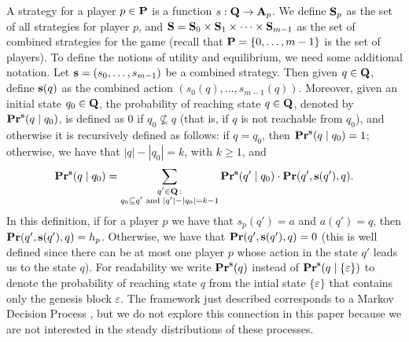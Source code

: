 A strategy for a player $p \in \mathbf{P}$ is a function $s : \mathbf{Q} \rightarrow \mathbf{A}_p$.
We define $\mathbf{S}_p$ as the set of all strategies for player $p$, and $\mathbf{S} = \mathbf{S}_0 \times \mathbf{S}_{1} \times \cdots \times \mathbf{S}_{m-1}$ as the set of combined strategies for the game (recall 
that $\mathbf{P} = \{0, \ldots, m-1\}$ is the set of players).
To define the notions of utility and equilibrium, we need some additional notation.
Let $\mathbf{s} = (s_0, \ldots, s_{m-1})$ be a combined strategy.
Then given $q \in \mathbf{Q}$, define $\mathbf{s}(q)$ as the combined action $(s_0(q), \ldots, s_{m-1}(q))$. Moreover, given an initial state $q_0 \in \mathbf{Q}$,
the probability of reaching state $q \in \mathbf{Q}$, denoted by $\mathbf{Pr}^{\mathbf{s}}(q \mid q_0)$, is defined as 0 if $q_0 \not\subseteq q$ (that is, if $q$ is not reachable from $q_0$), and otherwise it is recursively defined as follows: if $q = q_0$, then $\mathbf{Pr}^{\mathbf{s}}(q \mid q_0) = 1$; otherwise, we have that $|q| - |q_0| = k$, with $k \geq 1$, and
$$
\mathbf{Pr}^{\mathbf{s}}(q \mid q_0) =
\sum_{\substack{q' \in \mathbf{Q} \,:\\ q_0 \subseteq q' \text{ and } |q'| - |q_0| = k-1}}
 \mathbf{Pr}^{\mathbf{s}}(q' \mid q_0) \cdot \mathbf{Pr}(q', \mathbf{s}(q'), q).
 $$
In this definition, if for a player $p$ we have that $s_p(q') = a$ and $a(q') = q$, then $\mathbf{Pr}(q', \mathbf{s}(q'), q) = h_p$. Otherwise, we have that $\mathbf{Pr}(q', \mathbf{s}(q'), q) = 0$ 
(this is well defined since there can be at most one player $p$ whose action in the state $q'$ leads us to the state $q$). 
For readability we write $\mathbf{Pr}^{\mathbf{s}}(q)$ instead of $\mathbf{Pr}^{\mathbf{s}}(q \mid \{\varepsilon\})$ to denote the probability of reaching state $q$ from the intial state $\{\varepsilon\}$ that contains 
only the genesis block  $\varepsilon$. 
The framework just described corresponds to a Markov Decision Process \cite{MU05}, but we do not explore this connection in this paper because we are not interested in the steady distributions of these processes. 


